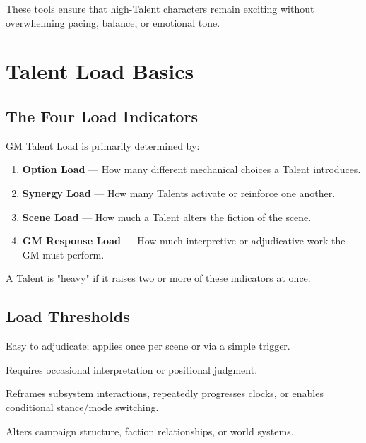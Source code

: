 \documentclass[11pt]{book}
\begin{document}
These tools ensure that high-Talent characters remain exciting without overwhelming pacing, balance, or emotional tone.

\section{Talent Load Basics}

\subsection{The Four Load Indicators}

GM Talent Load is primarily determined by:
\begin{enumerate}
    \item \textbf{Option Load} --- How many different mechanical choices a Talent introduces.
    \item \textbf{Synergy Load} --- How many Talents activate or reinforce one another.
    \item \textbf{Scene Load} --- How much a Talent alters the fiction of the scene.
    \item \textbf{GM Response Load} --- How much interpretive or adjudicative work the GM must perform.
\end{enumerate}

A Talent is "heavy" if it raises two or more of these indicators at once.

\subsection{Load Thresholds}

\begin{description}[leftmargin=1.8em]
    \item[Low Load]  
    Easy to adjudicate; applies once per scene or via a simple trigger.

    \item[Moderate Load]  
    Requires occasional interpretation or positional judgment.

    \item[High Load]  
    Reframes subsystem interactions, repeatedly progresses clocks, or enables conditional stance/mode switching.

    \item[Severe Load]  
    Alters campaign structure, faction relationships, or world systems.
\end{description}
\end{document}
